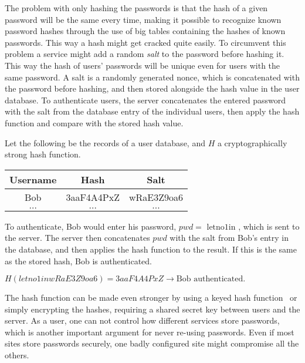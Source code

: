 \par The problem with only hashing the passwords is that the hash of a given password will be the same every time, making it possible to recognize known password hashes through the use of big tables containing the hashes of known passwords. This way a hash might get cracked quite easily. To circumvent this problem a service might add a random \emph{salt} to the password before hashing it. This way the hash of users' passwords will be unique even for users with the same password. A salt is a randomly generated nonce, which is concatenated with the password before hashing, and then stored alongside the hash value in the user database. To authenticate users, the server concatenates the entered password with the salt from the database entry of the individual users, then apply the hash function and compare with the stored hash value.

\begin{example}
Let the following be the records of a user database, and $H$ a cryptographically strong hash function.
    \begin{table}[ht!]
        \centering
    \begin{tabular}{|c|c|c|}
        \hline
        Username & Hash & Salt \\
        \hline
        Bob & 3aaF4A4PxZ & wRaE3Z9oa6 \\
        \hline
        $\dots$ & $\dots$ & $\dots$ \\
        \hline
    \end{tabular}
    \end{table}
\par To authenticate, Bob would enter his password, $pwd=\text{ letno1in }$, which is sent to the server. The server then concatenates $pwd$ with the salt from Bob's entry in the database, and then applies the hash function to the result. If this is the same as the stored hash, Bob is authenticated.\\
 \centerline{   $H(letno1inwRaE3Z9oa6) = 3aaF4A4PxZ \rightarrow \text{Bob authenticated}.$  }

\end{example}



The hash function can be made even stronger by using a keyed hash function~\cite{keyedhash} or simply encrypting the hashes, requiring a shared secret key between users and the server. As a user, one can not control how different services store passwords, which is another important argument for never re-using passwords. Even if most sites store passwords securely, one badly configured site might compromise all the others. 



